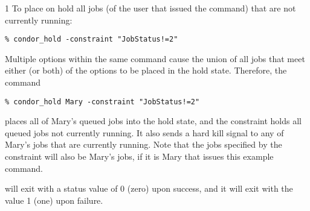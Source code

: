 \begin{ManPage}{\label{man-condor-hold}}{1}
\Examples
To place on hold all jobs
(of the user that issued the  command)
that are not currently running:
\footnotesize
\begin{verbatim}
% condor_hold -constraint "JobStatus!=2"
\end{verbatim}
\normalsize

Multiple options within the same command cause the union of 
all jobs that meet either (or both) of the options to be placed in the
hold state.
Therefore, the command
\footnotesize
\begin{verbatim}
% condor_hold Mary -constraint "JobStatus!=2"
\end{verbatim}
\normalsize
places all of Mary's queued jobs into the hold state, 
and the constraint holds all queued jobs not currently running.
It also sends a hard kill signal to any of Mary's jobs that are
currently running.
Note that the jobs specified by the constraint will also be
Mary's jobs, if it is Mary that issues this
example  command.

\ExitStatus

 will exit with a status value of 0 (zero) upon success,
and it will exit with the value 1 (one) upon failure.

\end{ManPage}
